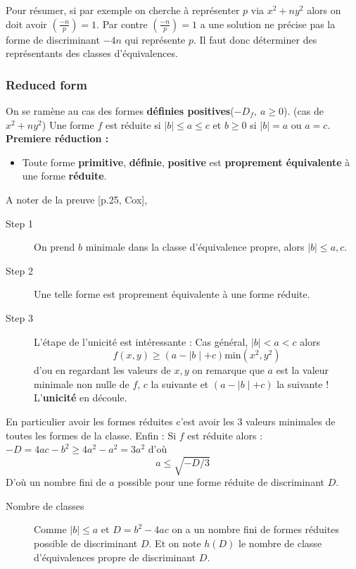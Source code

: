 \documentclass[12pt]{article}
\theoremstyle{plain}
\newcommand{\gr}{\color{Sepia}}
\newcommand{\rg}{\color{Red}}
\begin{document}
Pour résumer, si par exemple on cherche à représenter $p$ via $x^2+ny^2$ alors on doit avoir $\left(\frac{-n}{p}\right)=1$. Par contre
$\left(\frac{-n}{p}\right)=1$ a une solution ne précise pas la forme de discriminant $-4n$ qui représente $p$. Il faut donc déterminer 
des représentants des classes d'équivalences.

\subsubsection{Reduced form}
On se ramène au cas des formes \textbf{\gr définies positives}($-D_f,~a\geq 0$). (cas de $x^2+ny^2$)
Une forme $f$ est réduite si $|b|\leq a\leq c$ et $b\geq 0$ si $|b|=a$ ou $a=c$.\\

\noindent\textbf{\rg Premiere réduction :}
\begin{itemize}
    \item Toute forme \textbf{\gr primitive}, \textbf{\gr définie}, \textbf{\gr positive} est \textbf{\gr proprement équivalente} à une forme \textbf{\gr réduite}.
\end{itemize}

A noter de la preuve [p.25, Cox], \begin{description}
    \item[Step 1] On prend $b$ minimale dans la classe d'équivalence propre, alors $\mid b\mid\leq a,c$.
    \item[Step 2] Une telle forme est proprement équivalente à une forme réduite. 
    \item[Step 3] L'étape de l'unicité est intéressante : Cas général, $\mid b\mid<a<c$ alors $$f(x,y)\geq (a-\mid b\mid+c)\textrm{min}(x^2,y^2)$$
    d'ou en regardant les valeurs de $x,y$ on remarque que $a$ est la valeur minimale non nulle de $f$, $c$ la suivante et $(a-\mid b\mid+c)$ la suivante !
    L'\textbf{\gr unicité} en découle.
\end{description}

\noindent En particulier avoir les formes réduites c'est avoir les 3 valeurs minimales de toutes les formes de la classe. Enfin :
Si $f$ est réduite alors : $-D=4ac-b^2\geq 4a^2-a^2=3a^2$ d'où $$a\leq \sqrt{-D/3}$$
D'où un nombre fini de $a$ possible pour une forme réduite de discriminant $D$.
\begin{description}
    \item[\gr Nombre de classes] Comme $\mid b\mid\leq a$ et $D=b^2-4ac$ on a un nombre fini de formes réduites possible de discriminant $D$. Et on note 
    $h(D)$ le nombre de classe d'équivalences propre de discriminant $D$.
\end{description}
\end{document}
